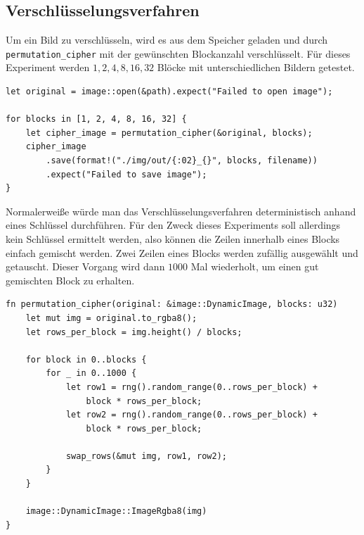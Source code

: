 \subsection{Verschlüsselungsverfahren}
Um ein Bild zu verschlüsseln, wird es aus dem Speicher geladen und durch \verb|permutation_cipher| mit der
gewünschten Blockanzahl verschlüsselt. Für
dieses Experiment werden $1,2,4,8,16,32$ Blöcke mit unterschiedlichen Bildern getestet. 
\begin{verbatim}
let original = image::open(&path).expect("Failed to open image");

for blocks in [1, 2, 4, 8, 16, 32] {
    let cipher_image = permutation_cipher(&original, blocks);
    cipher_image
        .save(format!("./img/out/{:02}_{}", blocks, filename))
        .expect("Failed to save image");
}
\end{verbatim}
Normalerweiße würde man das Verschlüsselungsverfahren deterministisch anhand eines
Schlüssel durchführen. Für den Zweck dieses Experiments soll allerdings 
kein Schlüssel ermittelt werden, also können die Zeilen innerhalb eines Blocks
einfach gemischt werden. Zwei Zeilen eines Blocks werden zufällig ausgewählt und
getauscht. Dieser Vorgang wird dann $1000$ Mal wiederholt, 
um einen gut gemischten Block zu erhalten.
\begin{verbatim}
fn permutation_cipher(original: &image::DynamicImage, blocks: u32) 
    let mut img = original.to_rgba8();
    let rows_per_block = img.height() / blocks;

    for block in 0..blocks {
        for _ in 0..1000 {
            let row1 = rng().random_range(0..rows_per_block) + 
                block * rows_per_block;
            let row2 = rng().random_range(0..rows_per_block) + 
                block * rows_per_block;

            swap_rows(&mut img, row1, row2);
        }
    }

    image::DynamicImage::ImageRgba8(img)
}
\end{verbatim}
